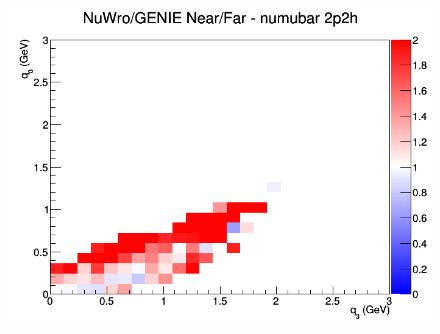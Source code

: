 \documentclass[12pt]{article}
\begin{document}
\begin{figure}[h]
\endminipage
{}
\includegraphics[width=\linewidth]{eff_q0_q3/LAr/ratios/2p2h_NuWro_GENIE_numubar_NF_q3_q0.png}
\endminipage
\newline
\end{figure}
\clearpage
\end{document}
